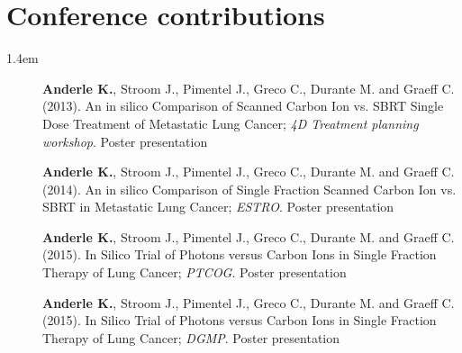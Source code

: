\section*{Conference contributions}
\begin{setlength}{\leftmargini}{1.4em}
  \begin{description}
    \item[] \textbf{Anderle K.}, Stroom J., Pimentel J., Greco C., Durante M. and Graeff C. (2013). An in silico Comparison of Scanned Carbon Ion vs. SBRT Single Dose Treatment of Metastatic Lung Cancer; \textit{4D Treatment planning workshop}. Poster presentation
    \item[] \textbf{Anderle K.}, Stroom J., Pimentel J., Greco C., Durante M. and Graeff C. (2014). An in silico Comparison of Single Fraction Scanned Carbon Ion vs. SBRT in Metastatic Lung Cancer; \textit{ESTRO}. Poster presentation
    \item[] \textbf{Anderle K.}, Stroom J., Pimentel J., Greco C., Durante M. and Graeff C. (2015). In Silico Trial of Photons versus Carbon Ions in Single Fraction Therapy of Lung Cancer; \textit{PTCOG}. Poster presentation
    \item[] \textbf{Anderle K.}, Stroom J., Pimentel J., Greco C., Durante M. and Graeff C. (2015). In Silico Trial of Photons versus Carbon Ions in Single Fraction Therapy of Lung Cancer; \textit{DGMP}. Poster presentation
    
    
    
      \end{description}
\end{setlength}




% 